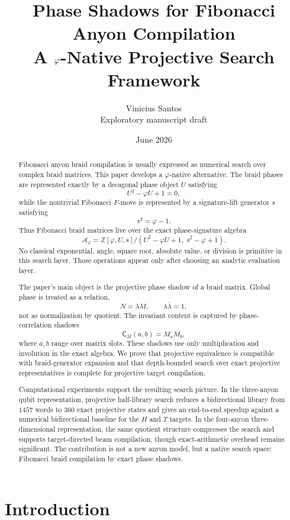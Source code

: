 \documentclass[11pt]{article}
\title{Phase Shadows for Fibonacci Anyon Compilation\\
\large A $\ph$-Native Projective Search Framework}
\author{Vinicius Santos\\
\small Exploratory manuscript draft}
\date{June 2026}
\newcommand{\ph}{\varphi}
\newcommand{\Z}{\mathbb Z}
\newcommand{\A}{\mathcal A}
\newcommand{\shadow}{\mathsf C}
\begin{document}
\maketitle

\begin{abstract}
Fibonacci anyon braid compilation is usually expressed as numerical search over complex braid matrices.  This paper develops a $\ph$-native alternative.  The braid phases are represented exactly by a decagonal phase object $U$ satisfying
\[
    U^2-\ph U+1=0,
\]
while the nontrivial Fibonacci $F$-move is represented by a signature-lift generator $s$ satisfying
\[
    s^2=\ph-1.
\]
Thus Fibonacci braid matrices live over the exact phase-signature algebra
\[
    \A_\ph=\Z[\ph,U,s]/(U^2-\ph U+1,\;s^2-\ph+1).
\]
No classical exponential, angle, square root, absolute value, or division is primitive in this search layer.  Those operations appear only after choosing an analytic evaluation layer.

The paper's main object is the projective phase shadow of a braid matrix.  Global phase is treated as a relation,
\[
    N=\lambda M,\qquad \lambda\bar\lambda=1,
\]
not as normalization by quotient.  The invariant content is captured by phase-correlation shadows
\[
    \shadow_M(a,b)=M_a\overline{M_b},
\]
where $a,b$ range over matrix slots.  These shadows use only multiplication and involution in the exact algebra.  We prove that projective equivalence is compatible with braid-generator expansion and that depth-bounded search over exact projective representatives is complete for projective target compilation.

Computational experiments support the resulting search picture.  In the three-anyon qubit representation, projective half-library search reduces a bidirectional library from $1457$ words to $360$ exact projective states and gives an end-to-end speedup against a numerical bidirectional baseline for the $H$ and $T$ targets.  In the four-anyon three-dimensional representation, the same quotient structure compresses the search and supports target-directed beam compilation, though exact-arithmetic overhead remains significant.  The contribution is not a new anyon model, but a native search space: Fibonacci braid compilation by exact phase shadows.
\end{abstract}

\tableofcontents

\section{Introduction}
\end{document}
